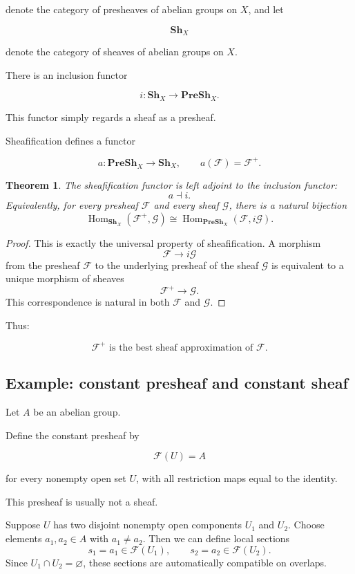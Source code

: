 \documentclass[12pt,a4paper]{article}
\DeclareMathOperator{\Hom}{Hom}
\newcommand{\PreSh}{\mathbf{PreSh}}
\newcommand{\Sh}{\mathbf{Sh}}
\theoremstyle{notespace}
\newtheorem{theorem}[definition]{Theorem}
\begin{document}
denote the category of presheaves of abelian groups on $X$, and let

\[
\Sh_X
\]

denote the category of sheaves of abelian groups on $X$.

There is an inclusion functor

\[
i : \Sh_X \longrightarrow \PreSh_X.
\]

This functor simply regards a sheaf as a presheaf.

Sheafification defines a functor

\[
a : \PreSh_X \longrightarrow \Sh_X,
\qquad
a(\mathcal F)=\mathcal F^+.
\]

\begin{theorem}
	The sheafification functor is left adjoint to the inclusion functor:
	\[
	a \dashv i.
	\]
	Equivalently, for every presheaf $\mathcal F$ and every sheaf $\mathcal G$,
	there is a natural bijection
	\[
	\Hom_{\Sh_X}(\mathcal F^+,\mathcal G)
	\cong
	\Hom_{\PreSh_X}(\mathcal F,i\mathcal G).
	\]
\end{theorem}

\begin{proof}
	This is exactly the universal property of sheafification.
	A morphism
	\[
	\mathcal F \longrightarrow i\mathcal G
	\]
	from the presheaf $\mathcal F$ to the underlying presheaf of the sheaf
	$\mathcal G$ is equivalent to a unique morphism of sheaves
	\[
	\mathcal F^+ \longrightarrow \mathcal G.
	\]
	This correspondence is natural in both $\mathcal F$ and $\mathcal G$.
\end{proof}

Thus:

\[
\boxed{
	\mathcal F^+ \text{ is the best sheaf approximation of } \mathcal F.
}
\]

\subsection{Example: constant presheaf and constant sheaf}
Let $A$ be an abelian group.

Define the constant presheaf by

\[
\mathcal F(U)=A
\]

for every nonempty open set $U$, with all restriction maps equal to the identity.

This presheaf is usually not a sheaf.

Suppose $U$ has two disjoint nonempty open components $U_1$ and $U_2$.
Choose elements $a_1,a_2 \in A$ with $a_1 \neq a_2$.
Then we can define local sections
\[
s_1=a_1 \in \mathcal F(U_1),
\qquad
s_2=a_2 \in \mathcal F(U_2).
\]
Since $U_1 \cap U_2=\varnothing$, these sections are automatically compatible
on overlaps.
\end{document}
